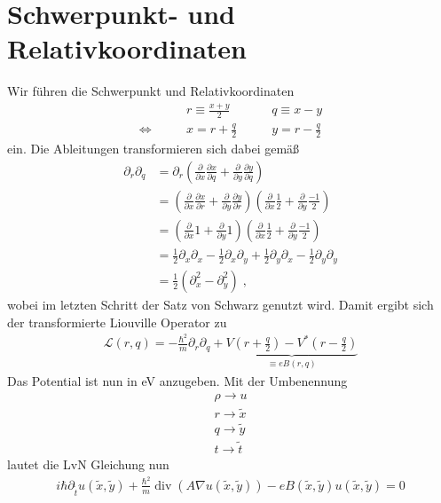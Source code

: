 \section{Schwerpunkt- und Relativkoordinaten}
Wir führen die Schwerpunkt und Relativkoordinaten
\begin{align}
  &r \equiv \frac{x+y}{2} \qquad &q \equiv x-y \\
  \Leftrightarrow\qquad &x = r+\frac{q}{2} \qquad &y = r-\frac{q}{2}
\end{align}
ein. Die Ableitungen transformieren sich dabei gemäß
\begin{align}
  \partial_r \partial_q  &= \partial_r \left( \frac{\partial}{\partial x} \frac{\partial x}{\partial q} + \frac{\partial}{\partial y} \frac{\partial y}{\partial q}\right) \\
   &= \left( \frac{\partial}{\partial x} \frac{\partial x}{\partial r} + \frac{\partial}{\partial y} \frac{\partial y}{\partial r}\right) \left( \frac{\partial}{\partial x} \frac{1}{2} + \frac{\partial}{\partial y} \frac{-1}{2}\right)\\
    &= \left( \frac{\partial}{\partial x} 1 + \frac{\partial}{\partial y} 1\right) \left( \frac{\partial}{\partial x} \frac{1}{2} + \frac{\partial}{\partial y} \frac{-1}{2}\right)\\
   &= \frac{1}{2}\partial_x \partial_x - \frac{1}{2}\partial_x \partial_y + \frac{1}{2}\partial_y \partial_x - \frac{1}{2}\partial_y \partial_y \\
  &=  \frac{1}{2}(\partial_x^2 - \partial_y^2) \; ,
\end{align}
wobei im letzten Schritt der Satz von Schwarz genutzt wird. Damit ergibt sich der transformierte Liouville Operator zu
\begin{align}
  \mathcal{L}(r,q) = -\frac{\hbar^2}{m} \partial_r\partial_q + \underbrace{V\left(r+\frac{q}{2}\right) - V^*\left(r-\frac{q}{2}\right)}_{\equiv e B(r,q)}
\end{align}
Das Potential ist nun in eV anzugeben. Mit der Umbenennung
\begin{align*}
  \rho \longrightarrow u \\
  r \longrightarrow \tilde{x} \\
  q \longrightarrow \tilde{y} \\
  t \longrightarrow \tilde{t}
\end{align*}
lautet die LvN Gleichung nun
\begin{align}
  i\hbar\partial_{\tilde{t}} u(\tilde{x},\tilde{y})+\frac{\hbar^2}{m}\operatorname{div}(A\nabla u(\tilde{x},\tilde{y})) - e B(\tilde{x},\tilde{y}) u(\tilde{x},\tilde{y}) = 0
\end{align}

